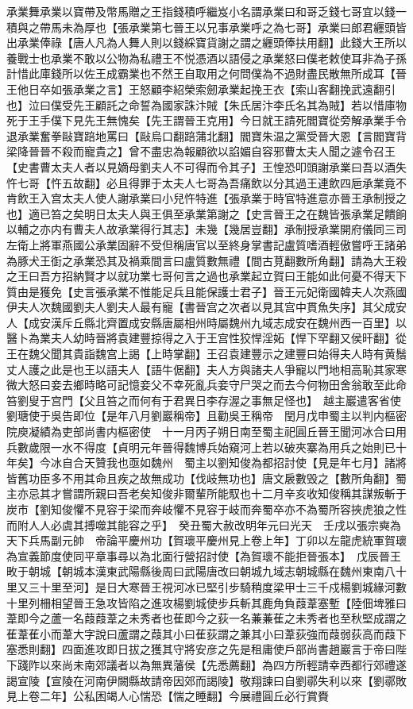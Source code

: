 承業舞承業以寶帶及幣馬贈之王指錢積呼繼岌小名謂承業曰和哥乏錢七哥宜以錢一積與之帶馬未為厚也【張承業第七晉王以兄事承業呼之為七哥】承業曰郎君纒頭皆出承業俸祿【唐人凡為人舞人則以錢綵寶貨謝之謂之纒頭俸扶用翻】此錢大王所以養戰士也承業不敢以公物為私禮王不悦憑酒以語侵之承業怒曰僕老敕使耳非為子孫計惜此庫錢所以佐王成霸業也不然王自取用之何問僕為不過財盡民散無所成耳【晉王他日卒如張承業之言】王怒顧李紹榮索劒承業起挽王衣【索山客翻挽武遠翻引也】泣曰僕受先王顧託之命誓為國家誅汴賊【朱氏居汴李氏名其為賊】若以惜庫物死于王手僕下見先王無愧矣【先王謂晉王克用】今日就王請死閻寶從旁解承業手令退承業奮拳敺寶踣地罵曰【敺烏口翻踣蒲北翻】閻寶朱温之黨受晉大恩【言閻寶背梁降晉晉不殺而寵貴之】曾不盡忠為報顧欲以諂媚自容邪曹太夫人聞之遽令召王【史書曹太夫人者以見嫡母劉夫人不可得而令其子】王惶恐叩頭謝承業曰吾以酒失忤七哥【忤五故翻】必且得罪于太夫人七哥為吾痛飲以分其過王連飲四巵承業竟不肯飲王入宫太夫人使人謝承業曰小兒忤特進【張承業于時官特進意亦晉王承制授之也】適已笞之矣明日太夫人與王俱至承業第謝之【史言晉王之在魏皆張承業足饋餉以輔之亦内有曹夫人故承業得行其志】未幾【幾居豈翻】承制授承業開府儀同三司左衛上將軍燕國公承業固辭不受但稱唐官以至終身掌書記盧質嗜酒輕傲嘗呼王諸弟為豚犬王衘之承業恐其及禍乘間言曰盧質數無禮【間古莧翻數所角翻】請為大王殺之王曰吾方招納賢才以就功業七哥何言之過也承業起立賀曰王能如此何憂不得天下質由是獲免【史言張承業不惟能足兵且能保護士君子】晉王元妃衛國韓夫人次燕國伊夫人次魏國劉夫人劉夫人最有寵【書晉宫之次者以見其宫中貫魚失序】其父成安人【成安漢斥丘縣北齊置成安縣唐屬相州時屬魏州九域志成安在魏州西一百里】以醫卜為業夫人幼時晉將袁建豐掠得之入于王宫性狡悍淫妬【悍下罕翻又侯旰翻】從王在魏父聞其貴詣魏宫上謁【上時掌翻】王召袁建豐示之建豐曰始得夫人時有黄鬚丈人護之此是也王以語夫人【語牛倨翻】夫人方與諸夫人爭寵以門地相高恥其家寒微大怒曰妾去鄉時略可記憶妾父不幸死亂兵妾守尸哭之而去今何物田舍翁敢至此命笞劉叟于宫門【父且笞之而何有于君異日李存渥之事無足怪也】　越主巖遣客省使劉瑭使于吳告即位【是年八月劉巖稱帝】且勸吳王稱帝　閏月戊申蜀主以判内樞密院庾凝績為吏部尚書内樞密使　十一月丙子朔日南至蜀主祀圓丘晉王聞河冰合曰用兵數歲限一水不得度【貞明元年晉得魏博兵始窺河上若以破夾寨為用兵之始則已十年矣】今冰自合天贊我也亟如魏州　蜀主以劉知俊為都招討使【見是年七月】諸將皆舊功臣多不用其命且疾之故無成功【伐岐無功也】唐文扆數毁之【數所角翻】蜀主亦忌其才嘗謂所親曰吾老矣知俊非爾輩所能馭也十二月辛亥收知俊稱其謀叛斬于炭市【劉知俊懼不見容于梁而奔岐懼不見容于岐而奔蜀卒亦不為蜀所容挾虎狼之性而附人人必虞其搏噬其能容之乎】　癸丑蜀大赦改明年元曰光天　壬戌以張宗奭為天下兵馬副元帥　帝論平慶州功【賀瓌平慶州見上卷上年】丁卯以左龍虎統軍賀瓌為宣義節度使同平章事尋以為北面行營招討使【為賀瓌不能拒晉張本】　戊辰晉王畋于朝城【朝城本漢東武陽縣後周曰武陽唐改曰朝城九域志朝城縣在魏州東南八十里又三十里至河】是日大寒晉王視河冰已堅引步騎稍度梁甲士三千戍楊劉城緣河數十里列柵相望晉王急攻皆陷之進攻楊劉城使步兵斬其鹿角負葭葦塞塹【陸佃埤雅曰葦即今之蘆一名葭葭葦之未秀者也萑即今之荻一名蒹蒹萑之未秀者也至秋堅成謂之萑葦萑小而葦大字說曰蘆謂之葭其小曰萑荻謂之兼其小曰葦荻強而葭弱荻高而葭下塞悉則翻】四面進攻即日拔之獲其守將安彦之先是租庸使戶部尚書趙巖言于帝曰陛下踐阼以來尚未南郊議者以為無異藩侯【先悉薦翻】為四方所輕請幸西都行郊禮遂謁宣陵【宣陵在河南伊闕縣故請帝因郊而謁陵】敬翔諫曰自劉鄩失利以來【劉鄩敗見上卷二年】公私困竭人心惴恐【惴之睡翻】今展禮圓丘必行賞賚